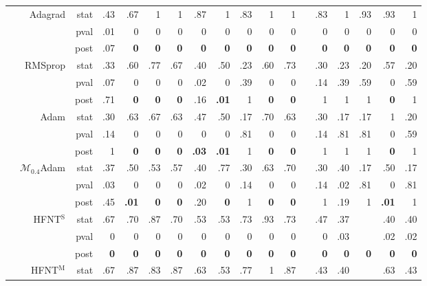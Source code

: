 \documentclass[11pt,a4paper]{article}
\begin{document}
\begin{table}
\begin{tabular}[t]{lrrrrrrrrrrrrrrrrr}
& Adagrad & stat & .43 & .67 & 1 & 1 & .87 & 1 & .83 & 1 & 1 &  & .83 & 1 & .93 & .93 & 1 \\
            & & pval & .01 & 0 & 0 & 0 & 0 & 0 & 0 & 0 & 0 &  & 0 & 0 & 0 & 0 & 0 \\
            & & post & .07 & \textbf{0} & \textbf{0} & \textbf{0} & \textbf{0} & \textbf{0} & \textbf{0} & \textbf{0} & \textbf{0} &  & \textbf{0} & \textbf{0} & \textbf{0} & \textbf{0} & \textbf{0} \\
& RMSprop & stat & .33 & .60 & .77 & .67 & .40 & .50 & .23 & .60 & .73 &  & .30 & .23 & .20 & .57 & .20 \\
            & & pval & .07 & 0 & 0 & 0 & .02 & 0 & .39 & 0 & 0 &  & .14 & .39 & .59 & 0 & .59 \\
            & & post & .71 & \textbf{0} & \textbf{0} & \textbf{0} & .16 & \textbf{.01} & 1 & \textbf{0} & \textbf{0} &  & 1 & 1 & 1 & \textbf{0} & 1 \\
& Adam & stat & .30 & .63 & .67 & .63 & .47 & .50 & .17 & .70 & .63 &  & .30 & .17 & .17 & 1 & .20 \\
            & & pval & .14 & 0 & 0 & 0 & 0 & 0 & .81 & 0 & 0 &  & .14 & .81 & .81 & 0 & .59 \\
            & & post & 1 & \textbf{0} & \textbf{0} & \textbf{0} & \textbf{.03} & \textbf{.01} & 1 & \textbf{0} & \textbf{0} &  & 1 & 1 & 1 & \textbf{0} & 1 \\
& $\mathcal{M}_{0.4}$Adam & stat & .37 & .50 & .53 & .57 & .40 & .77 & .30 & .63 & .70 &  & .30 & .40 & .17 & .50 & .17  \\ 
             & & pval & .03 & 0 & 0 & 0 & .02 & 0 & .14 & 0 & 0 &  & .14 & .02 & .81 & 0 & .81  \\ 
             & & post & .45 & \textbf{.01} & \textbf{0} & \textbf{0} & .20 & \textbf{0} & 1 & \textbf{0} & \textbf{0} &  & 1 & .19 & 1 & \textbf{.01} & 1  \\ 
            \cmidrule{1-2}
\parbox[t]{3mm}{}	
            & HFNT$^{\text{S}}$ & stat & .67 & .70 & .87 & .70 & .53 & .53 & .73 & .93 & .73 &  & .47 & .37 &  & .40 & .40 \\
            &  & pval & 0 & 0 & 0 & 0 & 0 & 0 & 0 & 0 & 0 &  & 0 & .03 &  & .02 & .02 \\
            &  & post & \textbf{0} & \textbf{0} & \textbf{0} & \textbf{0} & \textbf{0} & \textbf{0} & \textbf{0} & \textbf{0} & \textbf{0} &  & \textbf{0} & \textbf{0} & \textbf{0} & \textbf{0} & \textbf{0} \\
& HFNT$^{\text{M}}$ & stat & .67 & .87 & .83 & .87 & .63 & .53 & .77 & 1 & .87 &  & .43 & .40 &  & .63 & .43 \\

\end{tabular}
\end{table}
\end{document}
